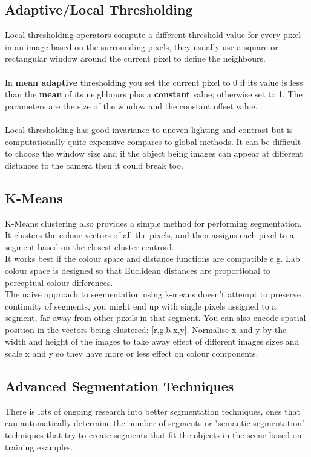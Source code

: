 \documentclass{article}
\begin{document}
	\subsection{Adaptive/Local Thresholding}
	Local thresholding operators compute a different threshold value for every pixel in an image based on the surrounding pixels, they usually use a square or rectangular window around the current pixel to define the neighbours.\\
	\\
	In \textbf{mean adaptive} thresholding you set the current pixel to 0 if its value is less than the \textbf{mean} of its neighbours plus a \textbf{constant} value; otherwise set to 1. The parameters are the size of the window and the constant offset value.\\
	\\
	Local thresholding has good invariance to uneven lighting and contrast but is computationally quite expensive compares to global methods. It can be difficult to choose the window size and if the object being images can appear at different distances to the camera then it could break too.
	\subsection{K-Means}
	K-Means clustering also provides a simple method for performing segmentation. It clusters the colour vectors of all the pixels, and then assigns each pixel to a segment based on the closest cluster centroid.\\
	It works best if the colour space and distance functions are compatible e.g. Lab colour space is designed so that Euclidean distances are proportional to perceptual colour differences.\\
	The naive approach to segmentation using k-means doesn't attempt to preserve continuity of segments, you might end up with single pixels assigned to a segment, far away from other pixels in that segment. You can also encode spatial position in the vectors being clustered: [r,g,b,x,y]. Normalise x and y by the width and height of the images to take away effect of different images sizes and scale x and y so they have more or less effect on colour components.
	\subsection{Advanced Segmentation Techniques}
	There is lots of ongoing research into better segmentation techniques, ones that can automatically determine the number of segments or "semantic segmentation" techniques that try to create segments that fit the objects in the scene based on training examples.
\end{document}
